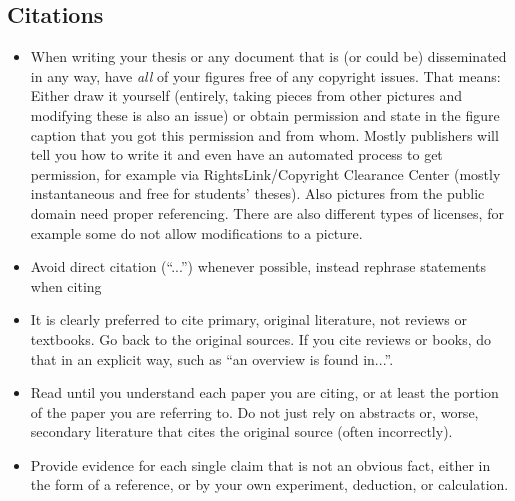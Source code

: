 \subsection{Citations}
\begin{itemize}
\item  When writing your thesis or any document that is (or could be) disseminated in any way, have \emph{all} of your figures free of any copyright issues. That means: Either draw it yourself (entirely, taking pieces from other pictures and modifying these is also an issue) or obtain permission and state in the figure caption that you got this permission and from whom. Mostly publishers will tell you how to write it and even have an automated process to get permission, for example via RightsLink/Copyright Clearance Center (mostly instantaneous and free for students' theses). Also pictures from the public domain need proper referencing. There are also different types of licenses, for example some do not allow modifications to a picture.

\item  Avoid direct citation (``...'') whenever possible, instead rephrase statements when citing

\item   It is clearly preferred to cite primary, original literature, not reviews or textbooks. Go back to the original sources. If you cite reviews or books, do that in an explicit way, such as ``an overview is found in...''.

\item  Read until you understand each paper you are citing, or at least the portion of the paper you are referring to. Do not just rely on abstracts or, worse, secondary literature that cites the original source (often incorrectly). %

\item Provide evidence for each single claim that is not an obvious fact, either in the form of a reference, or by your own experiment, deduction, or calculation. 

\end{itemize}

